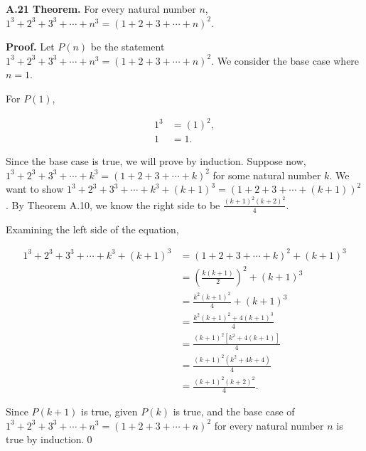 \documentclass[12pt]{article}
\begin{document}
\noindent\textbf{A.21 Theorem.} For every natural number $n$, $1^3+2^3+3^3+\cdots +n^3 = (1+2+3+\cdots +n)^2$.

\bigskip

\noindent\textbf{Proof.} Let $P(n)$ be the statement $1^3+2^3+3^3+\cdots +n^3 = (1+2+3+\cdots +n)^2$. We consider the base case where $n=1$. 

\bigskip

\noindent For $P(1)$,


\begin{align*}
1^3 &= (1)^2, \\
1 &= 1.
\end{align*}


\noindent Since the base case is true, we will prove by induction. Suppose now, $1^3+2^3+3^3+\cdots +k^3 = (1+2+3+\cdots +k)^2$ for some natural number $k$. We want to show $1^3+2^3+3^3+\cdots +k^3+(k+1)^3 = (1+2+3+\cdots +(k+1))^2$. By Theorem A.10, we know the right side to be $\frac{(k+1)^2(k+2)^2}{4}$. 

\bigskip
\noindent Examining the left side of the equation,


\begin{align*}
1^3+2^3+3^3+\cdots +k^3+(k+1)^3 &= (1+2+3+\cdots +k)^2 + (k+1)^3 \\
&= \left(\frac{k(k+1)}{2}\right)^2+(k+1)^3 \\
&= \frac{k^2(k+1)^2}{4}+(k+1)^3 \\
&= \frac{k^2(k+1)^2+4(k+1)^3}{4} \\
&= \frac{(k+1)^2[k^2+4(k+1)]}{4} \\
&= \frac{(k+1)^2(k^2+4k+4)}{4} \\
&= \frac{(k+1)^2(k+2)^2}{4}.
\end{align*}


\noindent Since $P(k+1)$ is true, given $P(k)$ is true, and the base case of $1^3+2^3+3^3+\cdots +n^3 = (1+2+3+\cdots +n)^2$ for every natural number $n$ is true by induction.\qed
\end{document}
